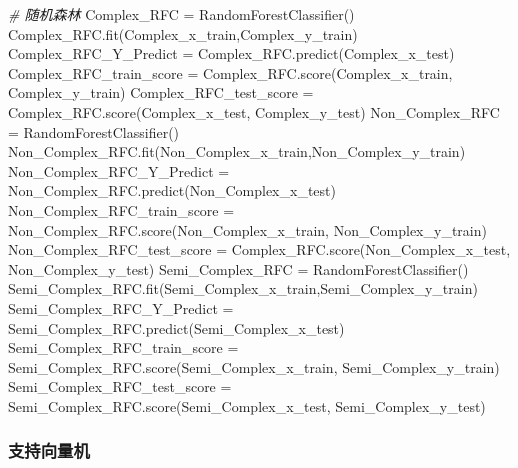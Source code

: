 \documentclass[
]{article}
\newenvironment{Shaded}{}{}
\newcommand{\CommentTok}[1]{\textcolor[rgb]{0.38,0.63,0.69}{\textit{#1}}}
\newcommand{\NormalTok}[1]{#1}
\newcommand{\OperatorTok}[1]{\textcolor[rgb]{0.40,0.40,0.40}{#1}}
\begin{document}
\begin{Shaded}
\begin{Highlighting}[]
\CommentTok{\# 随机森林}
\NormalTok{Complex\_RFC }\OperatorTok{=}\NormalTok{ RandomForestClassifier()}
\NormalTok{Complex\_RFC.fit(Complex\_x\_train,Complex\_y\_train)}
\NormalTok{Complex\_RFC\_Y\_Predict }\OperatorTok{=}\NormalTok{ Complex\_RFC.predict(Complex\_x\_test)}
\NormalTok{Complex\_RFC\_train\_score }\OperatorTok{=}\NormalTok{ Complex\_RFC.score(Complex\_x\_train, Complex\_y\_train)}
\NormalTok{Complex\_RFC\_test\_score }\OperatorTok{=}\NormalTok{ Complex\_RFC.score(Complex\_x\_test, Complex\_y\_test)}
\NormalTok{Non\_Complex\_RFC }\OperatorTok{=}\NormalTok{ RandomForestClassifier()}
\NormalTok{Non\_Complex\_RFC.fit(Non\_Complex\_x\_train,Non\_Complex\_y\_train)}
\NormalTok{Non\_Complex\_RFC\_Y\_Predict }\OperatorTok{=}\NormalTok{ Non\_Complex\_RFC.predict(Non\_Complex\_x\_test)}
\NormalTok{Non\_Complex\_RFC\_train\_score }\OperatorTok{=}\NormalTok{ Non\_Complex\_RFC.score(Non\_Complex\_x\_train, Non\_Complex\_y\_train)}
\NormalTok{Non\_Complex\_RFC\_test\_score }\OperatorTok{=}\NormalTok{ Complex\_RFC.score(Non\_Complex\_x\_test, Non\_Complex\_y\_test)}
\NormalTok{Semi\_Complex\_RFC }\OperatorTok{=}\NormalTok{ RandomForestClassifier()}
\NormalTok{Semi\_Complex\_RFC.fit(Semi\_Complex\_x\_train,Semi\_Complex\_y\_train)}
\NormalTok{Semi\_Complex\_RFC\_Y\_Predict }\OperatorTok{=}\NormalTok{ Semi\_Complex\_RFC.predict(Semi\_Complex\_x\_test)}
\NormalTok{Semi\_Complex\_RFC\_train\_score }\OperatorTok{=}\NormalTok{ Semi\_Complex\_RFC.score(Semi\_Complex\_x\_train, Semi\_Complex\_y\_train)}
\NormalTok{Semi\_Complex\_RFC\_test\_score }\OperatorTok{=}\NormalTok{ Semi\_Complex\_RFC.score(Semi\_Complex\_x\_test, Semi\_Complex\_y\_test)}
\end{Highlighting}
\end{Shaded}

\hypertarget{header-n295}{%
\subsubsection{支持向量机}\label{header-n295}}
\end{document}
